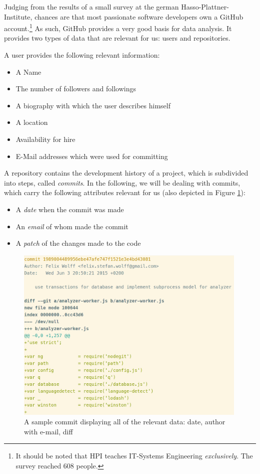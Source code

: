 
Judging from the results of a small survey at the german Hasso-Plattner-Institute,
chances are that most passionate software developers own a GitHub account.\footnote{It should be
noted that HPI teaches IT-Systems Engineering \textit{exclusively}. The
survey reached 608 people.}
As such, GitHub provides a very good basis for data analysis.
It provides two types of data that are relevant for us: users and repositories.
\newline

A user provides the following relevant information:
\begin{itemize}
  \item A Name
  \item The number of followers and followings
  \item A biography with which the user describes himself
  \item A location
  \item Availability for hire
  \item E-Mail addresses which were used for committing
\end{itemize}
\vspace{2em}

\noindent A repository contains the development history of a project, which is subdivided into steps,
called \textit{commits}. In the following, we will be dealing with commits,
which carry the following attributes relevant for us (also depicted in Figure \ref{fig:commit}):

\begin{itemize}
    \item A \textit{date} when the commit was made
    \item An \textit{email} of whom made the commit
    \item A \textit{patch} of the changes made to the code
\end{itemize}

\begin{figure}
    \includegraphics[width=30em]{gfx/commit.png}
    \caption{A sample commit displaying all of the relevant data: date, author with e-mail, diff}
    \label{fig:commit}
\end{figure}

